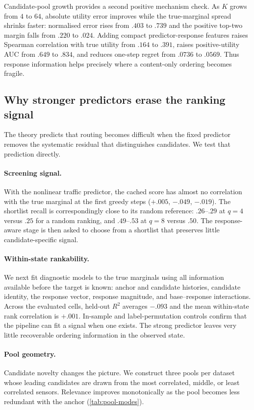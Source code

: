 Candidate-pool growth provides a second positive mechanism check. As $K$ grows
from $4$ to $64$, absolute utility error improves while the true-marginal spread
shrinks faster: normalised error rises from $.403$ to $.739$ and the positive
top-two margin falls from $.220$ to $.024$. Adding compact predictor-response
features raises Spearman correlation with true utility from $.164$ to $.391$,
raises positive-utility AUC from $.649$ to $.834$, and reduces one-step regret
from $.0736$ to $.0569$. Thus response information helps precisely where a
content-only ordering becomes fragile.


\subsection{Why stronger predictors erase the ranking signal}

The theory predicts that routing becomes difficult when the fixed predictor
removes the systematic residual that distinguishes candidates. We test that
prediction directly.

\paragraph{Screening signal.}
With the nonlinear traffic predictor, the cached score has almost no
correlation with the true marginal at the first greedy steps
($+.005$, $-.049$, $-.019$). The shortlist recall is correspondingly close to
its random reference: $.26$--$.29$ at $q=4$ versus $.25$ for a random ranking,
and $.49$--$.53$ at $q=8$ versus $.50$. The response-aware stage is then asked
to choose from a shortlist that preserves little candidate-specific signal.

\paragraph{Within-state rankability.}
We next fit diagnostic models to the true marginals using all information
available before the target is known: anchor and candidate histories, candidate
identity, the response vector, response magnitude, and base--response
interactions. Across the evaluated cells, held-out $R^2$ averages $-.093$ and
the mean within-state rank correlation is $+.001$. In-sample and
label-permutation controls confirm that the pipeline can fit a signal when one
exists. The strong predictor leaves very little recoverable ordering
information in the observed state.

\paragraph{Pool geometry.}
Candidate novelty changes the picture. We construct three pools per dataset
whose leading candidates are drawn from the most correlated, middle, or least
correlated sensors. Relevance improves monotonically as the pool becomes less
redundant with the anchor (\cref{tab:pool-modes}).

